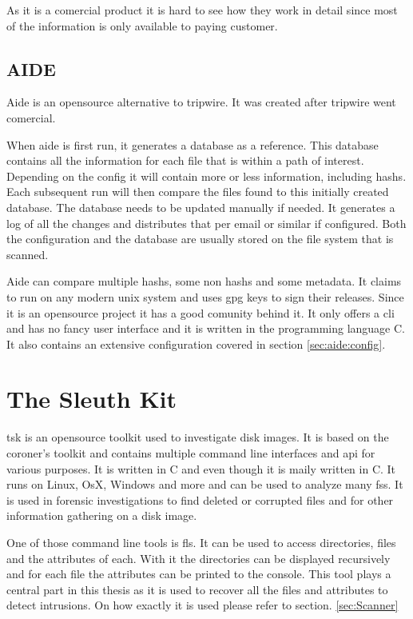 \documentclass[
	a4paper,					%
	10pt,							%
	twoside,					%
	openright,				%
	notitlepage,			%
	parskip=half,			%
]{scrreprt}					%
\begin{document}
As it is a comercial product it is hard to see how they work in detail since most of the information is only available to paying customer. 

\subsection{AIDE}
\label{sec:aide}

Aide is an \gls{opensource} alternative to tripwire. It was created after tripwire went comercial. \cite{aide:totherescue, aide:github}

When aide is first run, it generates a database as a reference. This database contains all the information for each file that is within a path of interest. Depending on the config it will contain more or less information, including \glspl{hash}. Each subsequent run will then compare the files found to this initially created database. The database needs to be updated manually if needed. It generates a log of all the changes and distributes that per email or similar if configured. Both the configuration and the database are usually stored on the file system that is scanned. \cite{aide, aide:doc}

Aide can compare multiple \glspl{hash}, some non \glspl{hash} and some \gls{metadata}. It claims to run on any modern unix system \cite{aide} and uses gpg keys to sign their releases. Since it is an \gls{opensource} project it has a good comunity behind it. It only offers a \gls{cli} and has no fancy user interface and it is written in the programming language C. \cite{aide:github} It also contains an extensive configuration covered in section \ref{sec:aide:config}.

\section{The Sleuth Kit}
\label{sec:tsk}

\gls{tsk} is an \gls{opensource} toolkit used to investigate disk images. It is based on the coroner's toolkit \cite{tct} and contains multiple command line interfaces and \gls{api} for various purposes. \cite{tsk, tsk:about} It is written in C and even though it is maily written in C. It runs on Linux, OsX, Windows and more and can be used to analyze many \glspl{fs}. It is used in forensic investigations to find deleted or corrupted files and for other information gathering on a disk image.

One of those command line tools is fls. It can be used to access directories, files and the attributes of each. With it the directories can be displayed recursively and for each file the attributes can be printed to the console. \cite{tsk:fls} This tool plays a central part in this thesis as it is used to recover all the files and attributes to detect intrusions. On how exactly it is used please refer to section. \ref{sec:Scanner}
\end{document}
